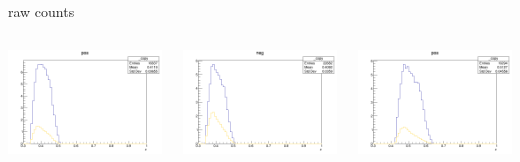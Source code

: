 \begin{frame}{raw counts}
\begin{columns}
\begin{column}[T]{0.25\textwidth}
\includegraphics[width = \textwidth]{results/yield/statistics/yield_x_Q2_z_0.50_5.500_0.40_pos.png}
\end{column}
\begin{column}[T]{0.25\textwidth}
\includegraphics[width = \textwidth]{results/yield/statistics/yield_x_Q2_z_0.50_5.500_0.40_neg.png}
\end{column}
\begin{column}[T]{0.25\textwidth}
\includegraphics[width = \textwidth]{results/yield/statistics/yield_x_Q2_z_0.50_5.500_0.50_pos.png}

\end{column}
\end{columns}
\end{frame}
